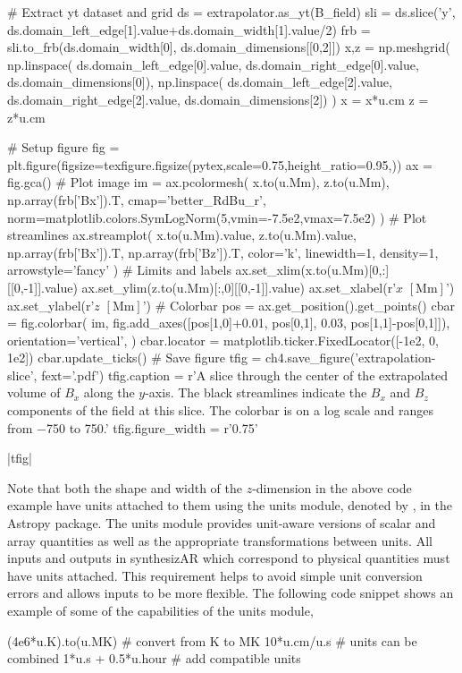 \begin{pycode}[chapter4]
# Extract yt dataset and grid
ds = extrapolator.as_yt(B_field)
sli = ds.slice('y', ds.domain_left_edge[1].value+ds.domain_width[1].value/2)
frb = sli.to_frb(ds.domain_width[0], ds.domain_dimensions[[0,2]])
x,z = np.meshgrid(
    np.linspace(
        ds.domain_left_edge[0].value,
        ds.domain_right_edge[0].value,
        ds.domain_dimensions[0]),
    np.linspace(
        ds.domain_left_edge[2].value,
        ds.domain_right_edge[2].value,
        ds.domain_dimensions[2])
)
x = x*u.cm
z = z*u.cm

# Setup figure
fig = plt.figure(figsize=texfigure.figsize(pytex,scale=0.75,height_ratio=0.95,))
ax = fig.gca()
# Plot image
im = ax.pcolormesh(
    x.to(u.Mm), z.to(u.Mm),
    np.array(frb['Bx']).T,
    cmap='better_RdBu_r',
    norm=matplotlib.colors.SymLogNorm(5,vmin=-7.5e2,vmax=7.5e2)
)
# Plot streamlines
ax.streamplot(
    x.to(u.Mm).value, z.to(u.Mm).value,
    np.array(frb['Bx']).T, np.array(frb['Bz']).T,
    color='k', linewidth=1, density=1, arrowstyle='fancy'
)
# Limits and labels
ax.set_xlim(x.to(u.Mm)[0,:][[0,-1]].value)
ax.set_ylim(z.to(u.Mm)[:,0][[0,-1]].value)
ax.set_xlabel(r'$x$ $[\si{\mega\m}]$')
ax.set_ylabel(r'$z$ $[\si{\mega\m}]$')
# Colorbar
pos = ax.get_position().get_points()
cbar = fig.colorbar(
    im,
    fig.add_axes([pos[1,0]+0.01, pos[0,1], 0.03, pos[1,1]-pos[0,1]]),
    orientation='vertical',
)
cbar.locator = matplotlib.ticker.FixedLocator([-1e2, 0, 1e2])
cbar.update_ticks()
# Save figure
tfig = ch4.save_figure('extrapolation-slice', fext='.pdf')
tfig.caption = r'A slice through the center of the extrapolated volume of $B_x$ along the $y$-axis. The black streamlines indicate the $B_x$ and $B_z$ components of the field at this slice. The colorbar is on a log scale and ranges from \SI{-750 }{\gauss} to \SI{750 }{\gauss}.'
tfig.figure_width = r'0.75\textwidth'
\end{pycode}
\py[chapter4]|tfig|

Note that both the shape and width of the $z$-dimension in the above code example have units attached to them using the units module, denoted by , in the Astropy package. The units module provides unit-aware versions of scalar and array quantities as well as the appropriate transformations between units. All inputs and outputs in synthesizAR which correspond to physical quantities must have units attached. This requirement helps to avoid simple unit conversion errors and allows inputs to be more flexible. The following code snippet shows an example of some of the capabilities of the units module,
\begin{pyblock}[chapter4][baselinestretch=1,xleftmargin=3em]
(4e6*u.K).to(u.MK)  # convert from K to MK
10*u.cm/u.s  # units can be combined
1*u.s + 0.5*u.hour  # add compatible units
\end{pyblock}

